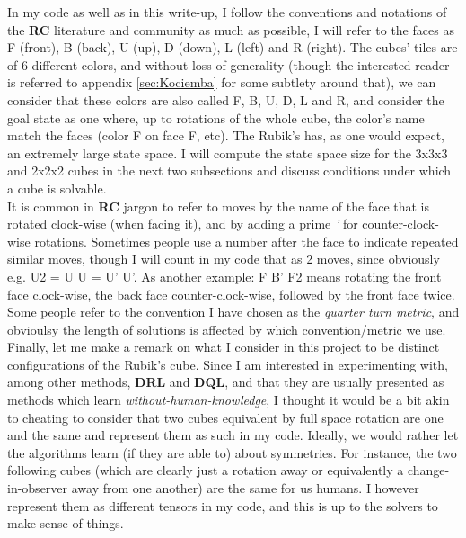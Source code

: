 In my code as well as in this write-up, I follow the conventions and notations of the \textbf{RC} literature and community as much as possible, I will refer to the faces as F (front), B (back), U (up), D (down), L (left) and R (right). The cubes' tiles are of 6 different colors, and without loss of generality (though the interested reader is referred to appendix \ref{sec:Kociemba} for some subtlety around that), we can consider that these colors are also called F, B, U, D, L and R, and consider the goal state as one where, up to rotations of the whole cube, the color's name match the faces (color F on face F, etc). The Rubik's has, as one would expect, an extremely large state space. I will compute the state space size for the 3x3x3 and 2x2x2 cubes in the next two subsections and discuss conditions under which  a cube is solvable.
\\
It is common in \textbf{RC} jargon to refer to moves  by the name of the face that is rotated clock-wise (when facing it), and by adding a prime \textit{'} for counter-clock-wise rotations. Sometimes people use a number after the face to indicate repeated similar moves, though I will count in my code that as 2 moves, since obviously e.g. U2 = U U = U' U'. As another example: F B' F2 means rotating the front face clock-wise, the back face counter-clock-wise, followed by the front face twice. Some people refer to the convention I have chosen as the \textit{quarter turn metric}, and obvioulsy the length of solutions is affected by which convention/metric we use.
\\
Finally, let me make a remark on what I consider in this project to be distinct configurations of the Rubik's cube. Since I am interested in experimenting with, among other methods, \textbf{DRL} and \textbf{DQL}, and that they are usually presented as methods which learn \textit{without-human-knowledge}, I thought it would be a bit akin to cheating to consider that two cubes equivalent by full space rotation are one and the same and represent them as such in my code. Ideally, we would rather let the algorithms learn (if they are able to) about symmetries. For instance, the two following cubes (which are clearly just a rotation away or equivalently a change-in-observer away from one another) are the same for us humans. I however represent them as different tensors in my code, and this is up to the solvers to make sense of things.

